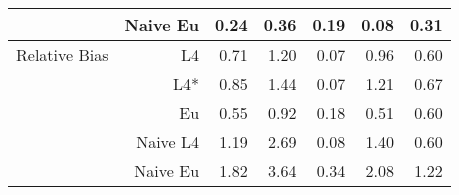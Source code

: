 \documentclass[a4paper,12pt,twoside]{book}
\begin{document}
\begin{table}[H]
\begin{tabular}{crrrrrr}
&Naive Eu & 0.24 & 0.36 & 0.19 & 0.08 & 0.31 \\ 
  
   \hline
   
{\color{blue} Relative Bias } & L4  &0.71 & 1.20 & 0.07 & 0.96 & 0.60 \\ 
  
&L4*  & 0.85 & 1.44 & 0.07 & 1.21 & 0.67 \\ 
 
  
&Eu &  
     0.55 & 0.92 & 0.18 & 0.51 & 0.60 \\ 
 
&Naive L4&  
  
1.19 & 2.69 & 0.08 & 1.40 & 0.60 \\
  
  
&Naive Eu &  
  1.82 & 3.64 & 0.34 & 2.08 & 1.22 \\ 
  
\end{tabular}

\end{table}
\end{document}
